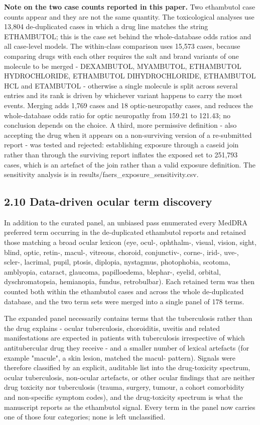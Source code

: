 \documentclass[utf8]{FrontiersinVancouver}
\begin{document}
\textbf{Note on the two case counts reported in this paper.} Two ethambutol case counts appear and they are not the same quantity. The toxicological analyses use 13,804 de-duplicated cases in which a drug line matches the string ETHAMBUTOL; this is the case set behind the whole-database odds ratios and all case-level models. The within-class comparison uses 15,573 cases, because comparing drugs with each other requires the salt and brand variants of one molecule to be merged - DEXAMBUTOL, MYAMBUTOL, ETHAMBUTOL HYDROCHLORIDE, ETHAMBUTOL DIHYDROCHLORIDE, ETHAMBUTOL HCL and ETAMBUTOL - otherwise a single molecule is split across several entries and its rank is driven by whichever variant happens to carry the most events. Merging adds 1,769 cases and 18 optic-neuropathy cases, and reduces the whole-database odds ratio for optic neuropathy from 159.21 to 121.43; no conclusion depends on the choice. A third, more permissive definition - also accepting the drug when it appears on a non-surviving version of a re-submitted report - was tested and rejected: establishing exposure through a caseid join rather than through the surviving report inflates the exposed set to 251,793 cases, which is an artefact of the join rather than a valid exposure definition. The sensitivity analysis is in results/faers\_exposure\_sensitivity.csv.
\subsection{2.10 Data-driven ocular term discovery}

In addition to the curated panel, an unbiased pass enumerated every MedDRA preferred term occurring in the de-duplicated ethambutol reports and retained those matching a broad ocular lexicon (eye, ocul-, ophthalm-, visual, vision, sight, blind, optic, retin-, macul-, vitreous, choroid, conjunctiv-, corne-, irid-, uve-, scler-, lacrimal, pupil, ptosis, diplopia, nystagmus, photophobia, scotoma, amblyopia, cataract, glaucoma, papilloedema, blephar-, eyelid, orbital, dyschromatopsia, hemianopia, fundus, retrobulbar). Each retained term was then counted both within the ethambutol cases and across the whole de-duplicated database, and the two term sets were merged into a single panel of 178 terms.

The expanded panel necessarily contains terms that the tuberculosis rather than the drug explains - ocular tuberculosis, choroiditis, uveitis and related manifestations are expected in patients with tuberculosis irrespective of which antitubercular drug they receive - and a smaller number of lexical artefacts (for example "macule", a skin lesion, matched the macul- pattern). Signals were therefore classified by an explicit, auditable list into the drug-toxicity spectrum, ocular tuberculosis, non-ocular artefacts, or other ocular findings that are neither drug toxicity nor tuberculosis (trauma, surgery, tumour, a cohort comorbidity and non-specific symptom codes), and the drug-toxicity spectrum is what the manuscript reports as the ethambutol signal. Every term in the panel now carries one of those four categories; none is left unclassified.
\end{document}

